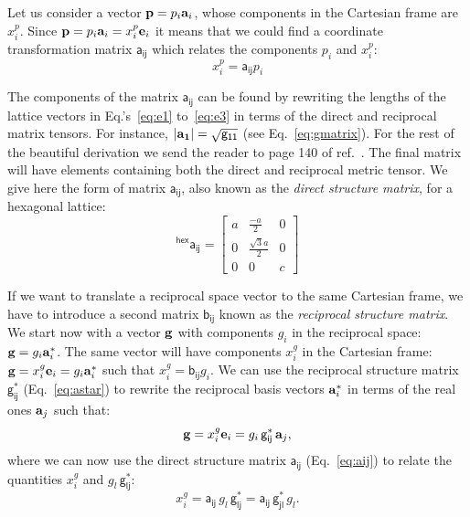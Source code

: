 Let us consider a vector $\mathbf{p}= p_i \vb{a}_i$, whose components in the Cartesian frame are~$x^p_i$. Since $\mathbf{p}= p_i \vb{a}_i=x^p_i\vb{e}_i$ it means that we could find a coordinate transformation matrix $\mathsf{a_{ij}}$ which relates the components $p_i$ and $x^p_i$: 
\begin{equation}
\label{eq:aij}
x^p_i = \mathsf{a_{ij}}  p_i
\end{equation}

The components of the matrix $\mathsf{a_{ij}}$ can be found by rewriting the lengths of the lattice vectors in Eq.'s~\ref{eq:e1} to~\ref{eq:e3} in terms of the direct and reciprocal matrix tensors. For instance, $|\vb{a_1}|=\sqrt{\mathsf{g_{11}}}$ (see Eq.~\ref{eq:gmatrix}). For the rest of the beautiful derivation we send the reader to page 140 of ref.~\cite{SoM}. The final matrix will have elements containing both the direct and reciprocal metric tensor. We give here the form of matrix $\mathsf{a_{ij}}$, also known as the \textit{direct structure matrix}, for a hexagonal lattice:
\begin{equation}
\mathsf{^{hex}a_{ij}}=\begin{bmatrix}
a & \frac{-a}{2}         & 0 \\[0.3em]
0 & \frac{\sqrt{3} a}{2}  & 0 \\[0.3em]
0  &   0          & c 
\end{bmatrix}
\end{equation}

If we want to translate a reciprocal space vector to the same Cartesian frame, we have to introduce a second matrix $\mathsf{b_{ij}}$ known as the \textit{reciprocal structure matrix}. We start now with a vector $\vb{g}$ with components $g_i$ in the reciprocal space: $\vb{g}=g_i \vb{a}^*_i$. The same vector will have components $x^g_i$ in the Cartesian frame: $\vb{g}=x^g_i \vb{e}_i = g_i \vb{a}^*_i$ such that $x^g_i=\mathsf{b_{ij}} g_i$. We can use the reciprocal structure matrix $\mathsf{g^*_{ij}}$ (Eq.~\ref{eq:astar}) to rewrite the reciprocal basis vectors $\vb{a}^*_i$ in terms of the real ones $\vb{a}_j$ such that: 
\begin{equation*}
\vb{g}=x^g_i \vb{e}_i = g_i \,\mathsf{g^*_{ij}} \, \vb{a}_j,  
\end{equation*}
where we can now use the direct structure matrix $\mathsf{a_{ij}}$ (Eq.~\ref{eq:aij}) to relate the quantities $x^g_i$ and $g_l \,\mathsf{g^*_{lj}}$:
\begin{equation*}
x^g_i = \mathsf{a_{ij}} \, g_l \,\mathsf{g^*_{lj}} = \mathsf{a_{ij}} \, \mathsf{g^*_{jl}} \,  g_l. 
\end{equation*}


